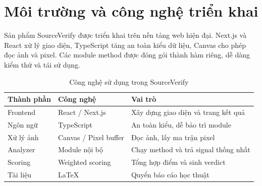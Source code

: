 \section{Môi trường và công nghệ triển khai}
Sản phẩm SourceVerify được triển khai trên nền tảng web hiện đại. Next.js và React xử lý giao diện, TypeScript tăng an toàn kiểu dữ liệu, Canvas cho phép đọc ảnh và pixel. Các module method được đóng gói thành hàm riêng, dễ dàng kiểm thử và tái sử dụng.

\begin{table}[h]
\centering
\caption{Công nghệ sử dụng trong SourceVerify}
\label{tab:tech-stack}
\begin{tabularx}{\textwidth}{p{}p{}Y}
\toprule
\textbf{Thành phần} & \textbf{Công nghệ} & \textbf{Vai trò} \\
\midrule
Frontend & React / Next.js & Xây dựng giao diện và trang kết quả \\
Ngôn ngữ & TypeScript & An toàn kiểu, dễ bảo trì module \\
Xử lý ảnh & Canvas / Pixel buffer & Đọc ảnh, lấy ma trận pixel \\
Analyzer & Module nội bộ & Chạy method và trả signal thống nhất \\
Scoring & Weighted scoring & Tổng hợp điểm và sinh verdict \\
Tài liệu & LaTeX & Quyển báo cáo học thuật \\
\bottomrule
\end{tabularx}
\end{table}
